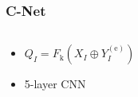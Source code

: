 \documentclass[12pt, aspectratio = 169, xcolor = x11names]{beamer}
\begin{document}
\begin{frame}
  \frametitle{C-Net}
  \begin{columns}
    \pause%
    \begin{column}{0.5\textwidth}
      \begin{itemize}[<+->]
        \item$Q_I = F_\mathrm{k}(X_I \oplus Y_I^{(\mathrm{e})})$
        \item 5-layer CNN
      \end{itemize}
    \end{column}
  \end{columns}
\end{frame}
\end{document}

